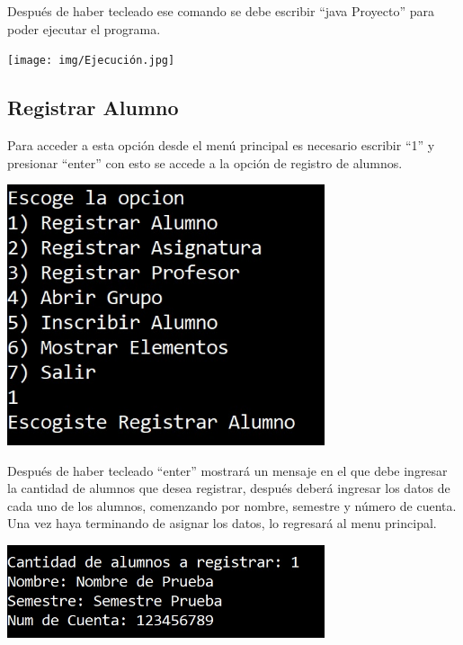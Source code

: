 \documentclass[12pt]{report}
\begin{document}
Después de haber tecleado ese comando se debe escribir ``java Proyecto'' para poder ejecutar el programa.

\begin{center}
    \texttt{[image: img/Ejecución.jpg]}
\end{center}

\subsection*{Registrar Alumno}

Para acceder a esta opción desde el menú principal es necesario escribir ``1'' y presionar ``enter'' con esto se accede a la opción de registro de alumnos.

\begin{center}
    \includegraphics[width=0.7\textwidth]{img/Opcion 1 P1.jpg}
\end{center}

\newpage
Después de haber tecleado ``enter'' mostrará un mensaje en el que debe ingresar la cantidad de alumnos que desea registrar, después deberá ingresar los datos de cada uno de los alumnos, comenzando por nombre, semestre y número de cuenta. Una vez haya terminando de asignar los datos, lo regresará al menu principal.

\begin{center}
    \includegraphics[width=0.7\textwidth]{img/Opcion 1 P2.jpg}
\end{center}

\end{document}
